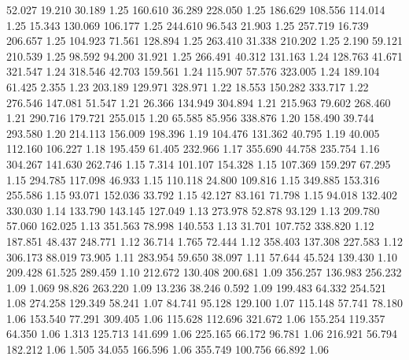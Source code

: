   52.027   19.210   30.189         1.25
 160.610   36.289  228.050         1.25
 186.629  108.556  114.014         1.25
  15.343  130.069  106.177         1.25
 244.610   96.543   21.903         1.25
 257.719   16.739  206.657         1.25
 104.923   71.561  128.894         1.25
 263.410   31.338  210.202         1.25
   2.190   59.121  210.539         1.25
  98.592   94.200   31.921         1.25
 266.491   40.312  131.163         1.24
 128.763   41.671  321.547         1.24
 318.546   42.703  159.561         1.24
 115.907   57.576  323.005         1.24
 189.104   61.425    2.355         1.23
 203.189  129.971  328.971         1.22
  18.553  150.282  333.717         1.22
 276.546  147.081   51.547         1.21
  26.366  134.949  304.894         1.21
 215.963   79.602  268.460         1.21
 290.716  179.721  255.015         1.20
  65.585   85.956  338.876         1.20
 158.490   39.744  293.580         1.20
 214.113  156.009  198.396         1.19
 104.476  131.362   40.795         1.19
  40.005  112.160  106.227         1.18
 195.459   61.405  232.966         1.17
 355.690   44.758  235.754         1.16
 304.267  141.630  262.746         1.15
   7.314  101.107  154.328         1.15
 107.369  159.297   67.295         1.15
 294.785  117.098   46.933         1.15
 110.118   24.800  109.816         1.15
 349.885  153.316  255.586         1.15
  93.071  152.036   33.792         1.15
  42.127   83.161   71.798         1.15
  94.018  132.402  330.030         1.14
 133.790  143.145  127.049         1.13
 273.978   52.878   93.129         1.13
 209.780   57.060  162.025         1.13
 351.563   78.998  140.553         1.13
  31.701  107.752  338.820         1.12
 187.851   48.437  248.771         1.12
  36.714    1.765   72.444         1.12
 358.403  137.308  227.583         1.12
 306.173   88.019   73.905         1.11
 283.954   59.650   38.097         1.11
  57.644   45.524  139.430         1.10
 209.428   61.525  289.459         1.10
 212.672  130.408  200.681         1.09
 356.257  136.983  256.232         1.09
   1.069   98.826  263.220         1.09
  13.236   38.246    0.592         1.09
 199.483   64.332  254.521         1.08
 274.258  129.349   58.241         1.07
  84.741   95.128  129.100         1.07
 115.148   57.741   78.180         1.06
 153.540   77.291  309.405         1.06
 115.628  112.696  321.672         1.06
 155.254  119.357   64.350         1.06
   1.313  125.713  141.699         1.06
 225.165   66.172   96.781         1.06
 216.921   56.794  182.212         1.06
   1.505   34.055  166.596         1.06
 355.749  100.756   66.892         1.06
